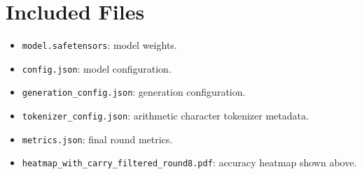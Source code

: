 \documentclass[11pt]{article}
\begin{document}
\section*{Included Files}

\begin{itemize}
  \item \texttt{model.safetensors}: model weights.
  \item \texttt{config.json}: model configuration.
  \item \texttt{generation\_config.json}: generation configuration.
  \item \texttt{tokenizer\_config.json}: arithmetic character tokenizer metadata.
  \item \texttt{metrics.json}: final round metrics.
  \item \texttt{heatmap\_with\_carry\_filtered\_round8.pdf}: accuracy heatmap shown above.
\end{itemize}
\end{document}
